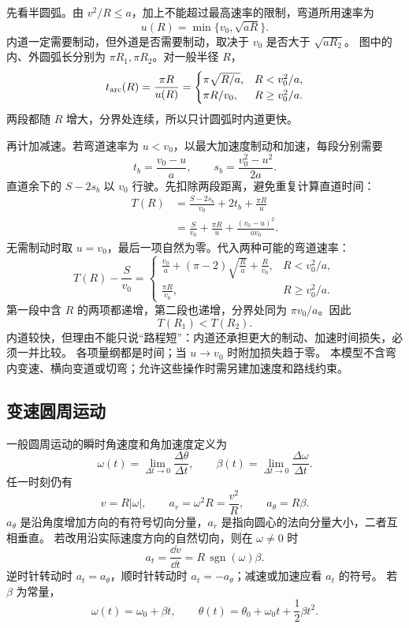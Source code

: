 {\begin{xesolution}
先看半圆弧。由 $v^2/R\le a$，加上不能超过最高速率的限制，弯道所用速率为
\[
 u(R)=\min\{v_0,\sqrt{aR}\}.
\]
内道一定需要制动，但外道是否需要制动，取决于 $v_0$ 是否大于 $\sqrt{aR_2}$。
\RacetrackDiagram
图中的内、外圆弧长分别为 $\pi R_1,\pi R_2$。对一般半径 $R$，
\[
 t_{\rm arc}(R)=\frac{\pi R}{u(R)}
 =\begin{cases}\pi\sqrt{R/a},&R<v_0^2/a,\\
 \pi R/v_0,&R\ge v_0^2/a.\end{cases}
\]
两段都随 $R$ 增大，分界处连续，所以只计圆弧时内道更快。

再计加减速。若弯道速率为 $u<v_0$，以最大加速度制动和加速，每段分别需要
\[
 t_b=\frac{v_0-u}{a},\qquad s_b=\frac{v_0^2-u^2}{2a}.
\]
直道余下的 $S-2s_b$ 以 $v_0$ 行驶。先扣除两段距离，避免重复计算直道时间：
\begin{align*}
 T(R)&=\frac{S-2s_b}{v_0}+2t_b+\frac{\pi R}{u}\\
 &=\frac S{v_0}+\frac{\pi R}{u}+\frac{(v_0-u)^2}{av_0}.
\end{align*}
无需制动时取 $u=v_0$，最后一项自然为零。代入两种可能的弯道速率：
\[
 T(R)-\frac S{v_0}
 =\begin{cases}
 \displaystyle\frac{v_0}{a}+(\pi-2)\sqrt{\frac Ra}+\frac R{v_0},
 &R<v_0^2/a,\\[2mm]
 \displaystyle\frac{\pi R}{v_0},&R\ge v_0^2/a.
 \end{cases}
\]
第一段中含 $R$ 的两项都递增，第二段也递增，分界处同为 $\pi v_0/a$。因此
\[
 \boxed{T(R_1)<T(R_2)}.
\]
内道较快，但理由不能只说“路程短”：内道还承担更大的制动、加速时间损失，必须一并比较。
各项量纲都是时间；当 $u\to v_0$ 时附加损失趋于零。
本模型不含弯内变速、横向变道或切弯；允许这些操作时需另建加速度和路线约束。
\end{xesolution}

\subsection{变速圆周运动}

一般圆周运动的瞬时角速度和角加速度定义为
\begin{equation}
 \omega(t)=\lim_{\Delta t\to0}\frac{\Delta\theta}{\Delta t},
 \qquad
 \beta(t)=\lim_{\Delta t\to0}\frac{\Delta\omega}{\Delta t}.
\end{equation}
任一时刻仍有
\begin{equation}
 v=R|\omega|,\qquad a_r=\omega^2R=\frac{v^2}{R},
 \qquad a_\theta=R\beta.
\end{equation}
$a_\theta$ 是沿角度增加方向的有符号切向分量，$a_r$ 是指向圆心的法向分量大小，二者互相垂直。
若改用沿实际速度方向的自然切向，则在 $\omega\ne0$ 时
\[
 a_t=\frac{\dd v}{\dd t}=R\,\operatorname{sgn}(\omega)\beta.
\]
逆时针转动时 $a_t=a_\theta$，顺时针转动时 $a_t=-a_\theta$；减速或加速应看 $a_t$ 的符号。
若 $\beta$ 为常量，
\begin{equation}
 \omega(t)=\omega_0+\beta t,\qquad
 \theta(t)=\theta_0+\omega_0t+\frac12\beta t^2.
\end{equation}

}
